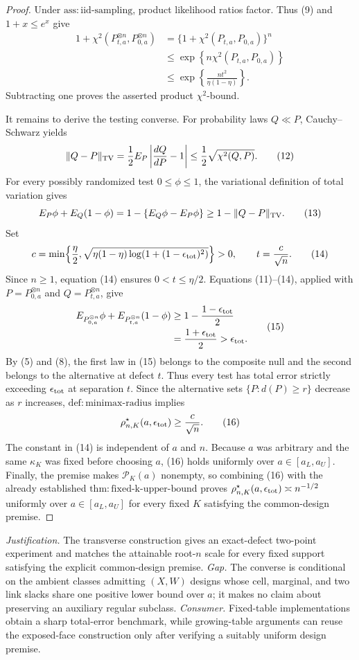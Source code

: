 \documentclass{article}
\begin{document}
\begin{proof}
Under \(\mathrm{ass:iid\mbox{-}sampling}\), product likelihood ratios factor. Thus (9) and \(1+x\le e^x\) give
\[
\begin{aligned}
1+\chi^2(P_{t,a}^{\otimes n},P_{0,a}^{\otimes n})
&=\{1+\chi^2(P_{t,a},P_{0,a})\}^n\\
&\le\exp\!\left\{n\chi^2(P_{t,a},P_{0,a})\right\}\\
&\le\exp\!\left\{\frac{nt^2}{\eta(1-\eta)}\right\}.
\end{aligned} \tag{11}
\]
Subtracting one proves the asserted product \(\chi^2\)-bound.

It remains to derive the testing converse. For probability laws \(Q\ll P\), Cauchy--Schwarz yields
\[
\|Q-P\|_{\rm TV}
=\frac12E_P\left|\frac{dQ}{dP}-1\right|
\le\frac12\sqrt{\chi^2(Q,P)}. \tag{12}
\]
For every possibly randomized test \(0\le\phi\le1\), the variational definition of total variation gives
\[
E_P\phi+E_Q(1-\phi)
=1-\{E_Q\phi-E_P\phi\}
\ge1-\|Q-P\|_{\rm TV}. \tag{13}
\]
Set
\[
c=\min\!\left\{\frac\eta2,
\sqrt{\eta(1-\eta)\log\!\left(1+(1-\epsilon_{\rm tot})^2\right)}\right\}>0,
\qquad
t=\frac{c}{\sqrt n}. \tag{14}
\]
Since \(n\ge1\), equation (14) ensures \(0<t\le\eta/2\). Equations (11)--(14), applied with \(P=P_{0,a}^{\otimes n}\) and \(Q=P_{t,a}^{\otimes n}\), give
\[
\begin{aligned}
E_{P_{0,a}^{\otimes n}}\phi+E_{P_{t,a}^{\otimes n}}(1-\phi)
&\ge1-\frac{1-\epsilon_{\rm tot}}2\\
&=\frac{1+\epsilon_{\rm tot}}2
>\epsilon_{\rm tot}. 
\end{aligned} \tag{15}
\]
By (5) and (8), the first law in (15) belongs to the composite null and the second belongs to the alternative at defect \(t\). Thus every test has total error strictly exceeding \(\epsilon_{\rm tot}\) at separation \(t\). Since the alternative sets \(\{P:d(P)\ge r\}\) decrease as \(r\) increases, \(\mathrm{def:minimax\mbox{-}radius}\) implies
\[
\rho^\star_{n,K}(a,\epsilon_{\rm tot})\ge\frac{c}{\sqrt n}. \tag{16}
\]
The constant in (14) is independent of \(a\) and \(n\). Because \(a\) was arbitrary and the same \(\kappa_K\) was fixed before choosing \(a\), (16) holds uniformly over \(a\in[a_L,a_U]\). Finally, the premise makes \(\mathcal P_K(a)\) nonempty, so combining (16) with the already established \(\mathrm{thm:fixed\mbox{-}k\mbox{-}upper\mbox{-}bound}\) proves \(\rho^\star_{n,K}(a,\epsilon_{\rm tot})\asymp n^{-1/2}\) uniformly over \(a\in[a_L,a_U]\) for every fixed \(K\) satisfying the common-design premise.
\end{proof}
\par\smallskip\noindent \textit{Justification.} The transverse construction gives an exact-defect two-point experiment and matches the attainable root-\(n\) scale for every fixed support satisfying the explicit common-design premise. \textit{Gap.} The converse is conditional on the ambient classes admitting \( (X,W) \) designs whose cell, marginal, and two link slacks share one positive lower bound over \(a\); it makes no claim about preserving an auxiliary regular subclass. \textit{Consumer.} Fixed-table implementations obtain a sharp total-error benchmark, while growing-table arguments can reuse the exposed-face construction only after verifying a suitably uniform design premise.
\end{document}
